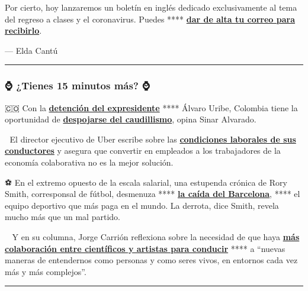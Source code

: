Por cierto, hoy lanzaremos un boletín en inglés dedicado exclusivamente
al tema del regreso a clases y el coronavirus. Puedes ****
\textbf{\href{https://www.nytimes3xbfgragh.onion/newsletters/coronavirus-schools-briefing}{dar
de alta tu correo para recibirlo}}.

--- Elda Cantú

\begin{center}\rule{0.5\linewidth}{\linethickness}\end{center}

\hypertarget{-tienes-15-minutos-muxe1s-}{%
\subsubsection{⌚ ¿Tienes 15 minutos más?
⌚}\label{-tienes-15-minutos-muxe1s-}}

🇨🇴 Con la
\textbf{\href{https://www.nytimes3xbfgragh.onion/es/2020/08/07/espanol/america-latina/alvaro-uribe-colombia.html}{detención
del expresidente}} **** Álvaro Uribe, Colombia tiene la oportunidad de
\textbf{\href{https://www.nytimes3xbfgragh.onion/es/2020/08/17/espanol/opinion/alvaro-uribe-colombia.html}{despojarse
del caudillismo}}, opina Sinar Alvarado.

🚖 El director ejecutivo de Uber escribe sobre las
\textbf{\href{https://www.nytimes3xbfgragh.onion/es/2020/08/14/espanol/opinion/ceo-uber-trabajadores.html}{condiciones
laborales de sus conductores}} y asegura que convertir en empleados a
los trabajadores de la economía colaborativa no es la mejor solución.

⚽ En el extremo opuesto de la escala salarial, una estupenda crónica de
Rory Smith, corresponsal de fútbol, desmenuza ****
\textbf{\href{https://www.nytimes3xbfgragh.onion/es/2020/08/14/espanol/deportes/bayern-barcelona-8-2-champions-messi.html}{la
caída del Barcelona}}, **** el equipo deportivo que más paga en el
mundo. La derrota, dice Smith, revela mucho más que un mal partido.

🧪 🎨Y en su columna, Jorge Carrión reflexiona sobre la necesidad de que
haya
\textbf{\href{https://www.nytimes3xbfgragh.onion/es/2020/08/16/espanol/opinion/coronavirus-arte.html}{más
colaboración entre científicos y artistas para conducir}} **** a
``nuevas maneras de entendernos como personas y como seres vivos, en
entornos cada vez más y más complejos''.

\begin{center}\rule{0.5\linewidth}{\linethickness}\end{center}

